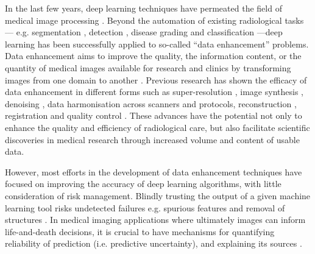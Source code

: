 In the last few years, deep learning techniques have permeated the field of medical image processing \cite{shen2017deep,litjens2017survey}. Beyond the automation of existing radiological tasks--- e.g. segmentation \cite{kamnitsas2017efficient}, detection \cite{roth2014new}, disease grading and classification \cite{araujo2017classification}---deep learning has been successfully applied to so-called ``data enhancement'' problems. Data enhancement aims to improve the quality, the information content, or the quantity of medical images available for research and clinics by transforming images from one domain to another \cite{isola2017image}. Previous research has shown the efficacy of data enhancement in different forms such as super-resolution \cite{oktay2016multi,chen2018efficient,ravi2019adversarial}, image synthesis \cite{nie2016estimating,kang2017deep}, denoising \cite{benou2017ensemble,chen2017low}, data harmonisation \cite{karayumak2018harmonizing,tax2019cross} across scanners and protocols, reconstruction \cite{sun2016deep,jin2017deep,hammernik2018learning,schlemper2018deep,zhu2018image,yang2018dagan,yoon2019efficient}, registration \cite{sokooti2017nonrigid,balakrishnan2018unsupervised} and quality control \cite{wu2017fuiqa,esses2018automated}.  These advances have the potential not only to enhance the quality and efficiency of radiological care, but also facilitate scientific discoveries in medical research through increased volume and content of usable data. 

However,  most efforts in the development of data enhancement techniques have focused on improving the accuracy of deep learning algorithms, with little consideration of risk management. Blindly trusting the output of a given machine learning tool risks undetected failures e.g. spurious features and removal of structures \cite{cohen2018distribution}. In medical imaging applications where ultimately images can inform life-and-death decisions, it is crucial to have mechanisms for quantifying reliability of prediction (i.e. predictive uncertainty), and explaining its sources \cite{begoli2019need}.  


